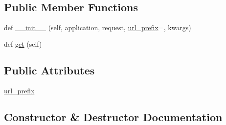\subsection*{Public Member Functions}
\begin{DoxyCompactItemize}
\item 
def \hyperlink{classmatplotlib_1_1backends_1_1backend__webagg_1_1WebAggApplication_1_1AllFiguresPage_a0f546fba08a4fbab374c877dab74a49c}{\+\_\+\+\_\+init\+\_\+\+\_\+} (self, application, request, \hyperlink{classmatplotlib_1_1backends_1_1backend__webagg_1_1WebAggApplication_1_1AllFiguresPage_a78c941eda5f9ea16d7dee4e4be6192b8}{url\+\_\+prefix}=\textquotesingle{}\textquotesingle{}, kwargs)
\item 
def \hyperlink{classmatplotlib_1_1backends_1_1backend__webagg_1_1WebAggApplication_1_1AllFiguresPage_a4572df2e896a9a54899757240200b7e5}{get} (self)
\end{DoxyCompactItemize}
\subsection*{Public Attributes}
\begin{DoxyCompactItemize}
\item 
\hyperlink{classmatplotlib_1_1backends_1_1backend__webagg_1_1WebAggApplication_1_1AllFiguresPage_a78c941eda5f9ea16d7dee4e4be6192b8}{url\+\_\+prefix}
\end{DoxyCompactItemize}


\subsection{Constructor \& Destructor Documentation}
\mbox{\label{classmatplotlib_1_1backends_1_1backend__webagg_1_1WebAggApplication_1_1AllFiguresPage_a0f546fba08a4fbab374c877dab74a49c}} 
